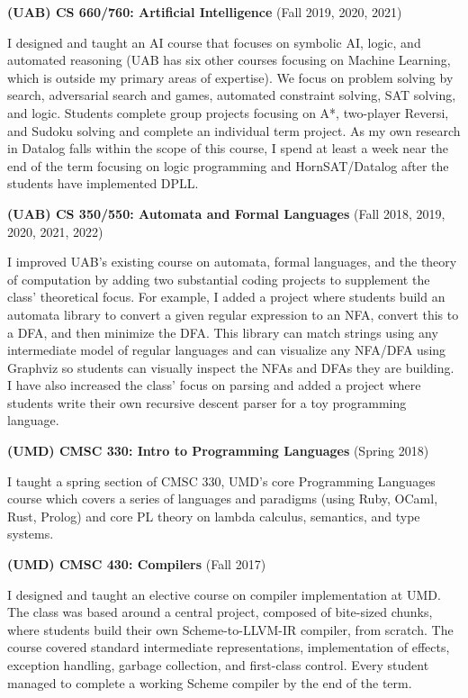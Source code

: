 \documentclass[line]{res}
\begin{document}
\begin{resume}
\textbf{(UAB) CS 660/760: Artificial Intelligence} (Fall 2019, 2020, 2021)

I designed and taught an AI course that focuses on symbolic AI, logic, and automated reasoning (UAB has six other courses focusing on Machine Learning, which is outside my primary areas of expertise). We focus on problem solving by search, adversarial search and games, automated constraint solving, SAT solving, and logic. Students complete group projects focusing on A*, two-player Reversi, and Sudoku solving and complete an individual term project. As my own research in Datalog falls within the scope of this course, I spend at least a week near the end of the term focusing on logic programming and HornSAT/Datalog after the students have implemented DPLL.

\textbf{(UAB) CS 350/550: Automata and Formal Languages} (Fall 2018, 2019, 2020, 2021, 2022)

I improved UAB's existing course on automata, formal languages, and the theory of computation by adding two substantial coding projects to supplement the class' theoretical focus. For example, I added a project where students build an automata library to convert a given regular expression to an NFA, convert this to a DFA, and then minimize the DFA. This library can match strings using any intermediate model of regular languages and can visualize any NFA/DFA using Graphviz so students can visually inspect the NFAs and DFAs they are building. I have also increased the class' focus on parsing and added a project where students write their own recursive descent parser for a toy programming language.

\textbf{(UMD) CMSC 330: Intro to Programming Languages} (Spring 2018)

I taught a spring section of CMSC 330, UMD's core Programming Languages course which covers a series of languages and paradigms (using Ruby, OCaml, Rust, Prolog) and core PL theory on lambda calculus, semantics, and type systems. 

\textbf{(UMD) CMSC 430: Compilers} (Fall 2017)

I designed and taught an elective course on compiler implementation at UMD. The class was based around a central project, composed of bite-sized chunks, where students build their own Scheme-to-LLVM-IR compiler, from scratch. The course covered standard intermediate representations, implementation of effects, exception handling, garbage collection, and first-class control. Every student managed to complete a working Scheme compiler by the end of the term.



\end{resume}
\end{document}
